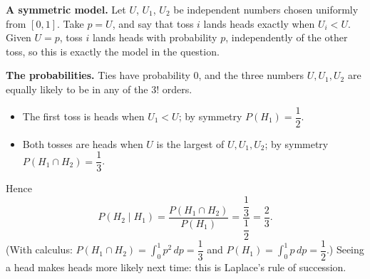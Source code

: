 \textbf{A symmetric model.} Let $U$, $U_1$, $U_2$ be independent numbers chosen uniformly from $[0,1]$. Take $p=U$, and say that toss $i$ lands heads exactly when $U_i<U$. Given $U=p$, toss $i$ lands heads with probability $p$, independently of the other toss, so this is exactly the model in the question.

\textbf{The probabilities.} Ties have probability $0$, and the three numbers $U,U_1,U_2$ are equally likely to be in any of the $3!$ orders.
\begin{itemize}
\item The first toss is heads when $U_1<U$; by symmetry $P(H_1)=\dfrac12$.
\item Both tosses are heads when $U$ is the largest of $U,U_1,U_2$; by symmetry $P(H_1\cap H_2)=\dfrac13$.
\end{itemize}
Hence
\[P(H_2\mid H_1)=\dfrac{P(H_1\cap H_2)}{P(H_1)}=\dfrac{\dfrac13}{\dfrac12}=\boxed{\dfrac23}.\]
(With calculus: $P(H_1\cap H_2)=\displaystyle\int_0^1p^2\,dp=\dfrac13$ and $P(H_1)=\displaystyle\int_0^1p\,dp=\dfrac12$.) Seeing a head makes heads more likely next time: this is Laplace's rule of succession.
